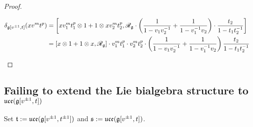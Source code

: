 \begin{proof}
\begin{enumerate}
$$\begin{aligned}
                                    \delta_{\g[v^{\pm 1}, t]}( x v^m t^p ) & = \left[x v_1^m t_1^p \tensor 1 + 1 \tensor x v_2^m t_2^p, \scrR_{\g} \cdot \left( \frac{1}{1 - v_1 v_2^{-1}} + \frac{1}{1 - v_1^{-1} v_2} \right) \cdot \frac{t_2}{1 - t_1 t_2^{-1}}\right]
                                    \\
                                    & = [x \tensor 1 + 1 \tensor x, \scrR_{\g}] \cdot v_1^m t_1^p \cdot v_2^m t_2^p \cdot \left( \frac{1}{1 - v_1 v_2^{-1}} + \frac{1}{1 - v_1^{-1} v_2} \right) \frac{t_2}{1 - t_1 t_2^{-1}}
                                \end{aligned}
                            $$
                    \end{enumerate}
                \end{proof}

        \subsection{Failing to extend the Lie bialgebra structure to \texorpdfstring{$\mathfrak{uce}( \mathfrak{g}[v^{\pm 1}, t] )$}{}}
            \begin{convention}
                Set $\mathfrak{t} := \mathfrak{uce}( \mathfrak{g}[v^{\pm 1}, t^{\pm 1}] )$ and $\mathfrak{s} := \mathfrak{uce}( \mathfrak{g}[v^{\pm 1}, t] )$. 
            \end{convention}
        
